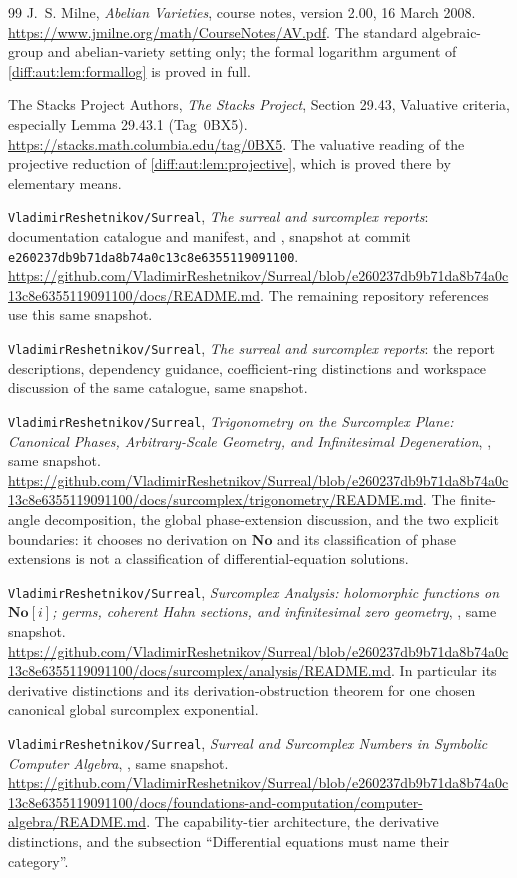 \documentclass[11pt,letterpaper]{article}
\numberwithin{equation}{section}
\theoremstyle{definition}
\theoremstyle{remark}
\newcommand{\No}{\mathbf{No}}
\newcommand{\Repo}{\texttt{VladimirReshetnikov/Surreal}}
\newcommand{\Commit}{\nolinkurl{e260237db9b71da8b74a0c13c8e6355119091100}}
\begin{document}
\begin{thebibliography}{99}
J.~S. Milne,
\emph{Abelian Varieties}, course notes, version 2.00, 16 March 2008.
\url{https://www.jmilne.org/math/CourseNotes/AV.pdf}.
The standard algebraic-group and abelian-variety setting only; the formal
logarithm argument of \cref{diff:aut:lem:formallog} is proved in full.

The Stacks Project Authors,
\emph{The Stacks Project}, Section 29.43, Valuative criteria,
especially Lemma 29.43.1 (Tag~0BX5).
\url{https://stacks.math.columbia.edu/tag/0BX5}.
The valuative reading of the projective reduction of
\cref{diff:aut:lem:projective}, which is proved there by elementary means.

\Repo, \emph{The surreal and surcomplex reports}: documentation catalogue and
manifest,  and , snapshot at
commit \Commit.
\url{https://github.com/VladimirReshetnikov/Surreal/blob/e260237db9b71da8b74a0c13c8e6355119091100/docs/README.md}.
The remaining repository references use this same snapshot.

\Repo, \emph{The surreal and surcomplex reports}: the report descriptions,
dependency guidance, coefficient-ring distinctions and workspace discussion
of the same catalogue, same snapshot.

\Repo, \emph{Trigonometry on the Surcomplex Plane: Canonical Phases,
Arbitrary-Scale Geometry, and Infinitesimal Degeneration},
, same snapshot.
\url{https://github.com/VladimirReshetnikov/Surreal/blob/e260237db9b71da8b74a0c13c8e6355119091100/docs/surcomplex/trigonometry/README.md}.
The finite-angle decomposition, the global phase-extension discussion, and the
two explicit boundaries: it chooses no derivation on $\No$ and its
classification of phase extensions is not a classification of
differential-equation solutions.

\Repo, \emph{Surcomplex Analysis: holomorphic functions on $\No[i]$; germs,
coherent Hahn sections, and infinitesimal zero geometry},
, same snapshot.
\url{https://github.com/VladimirReshetnikov/Surreal/blob/e260237db9b71da8b74a0c13c8e6355119091100/docs/surcomplex/analysis/README.md}.
In particular its derivative distinctions and its derivation-obstruction
theorem for one chosen canonical global surcomplex exponential.

\Repo, \emph{Surreal and Surcomplex Numbers in Symbolic Computer Algebra},
, same snapshot.
\url{https://github.com/VladimirReshetnikov/Surreal/blob/e260237db9b71da8b74a0c13c8e6355119091100/docs/foundations-and-computation/computer-algebra/README.md}.
The capability-tier architecture, the derivative distinctions, and the
subsection ``Differential equations must name their category''.


\end{thebibliography}
\end{document}
